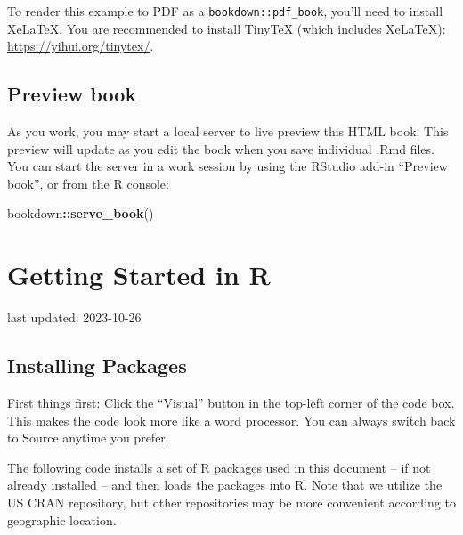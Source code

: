 \documentclass[
]{book}
\newenvironment{Shaded}{\begin{snugshade}}{\end{snugshade}}
\newcommand{\FunctionTok}[1]{\textcolor[rgb]{0.13,0.29,0.53}{\textbf{#1}}}
\newcommand{\NormalTok}[1]{#1}
\newcommand{\SpecialCharTok}[1]{\textcolor[rgb]{0.81,0.36,0.00}{\textbf{#1}}}
\begin{document}
To render this example to PDF as a \texttt{bookdown::pdf\_book}, you'll need to install XeLaTeX. You are recommended to install TinyTeX (which includes XeLaTeX): \url{https://yihui.org/tinytex/}.

\hypertarget{preview-book}{%
\section{Preview book}\label{preview-book}}

As you work, you may start a local server to live preview this HTML book. This preview will update as you edit the book when you save individual .Rmd files. You can start the server in a work session by using the RStudio add-in ``Preview book'', or from the R console:

\begin{Shaded}
\begin{Highlighting}[]
\NormalTok{bookdown}\SpecialCharTok{::}\FunctionTok{serve\_book}\NormalTok{()}
\end{Highlighting}
\end{Shaded}

\hypertarget{getting-started-in-r}{%
\chapter{Getting Started in R}\label{getting-started-in-r}}

last updated: 2023-10-26

\hypertarget{installing-packages}{%
\section{Installing Packages}\label{installing-packages}}

First things first: Click the ``Visual'' button in the top-left corner of the code box. This makes the code look more like a word processor. You can always switch back to Source anytime you prefer.

The following code installs a set of R packages used in this document -- if not already installed -- and then loads the packages into R. Note that we utilize the US CRAN repository, but other repositories may be more convenient according to geographic location.
\end{document}
